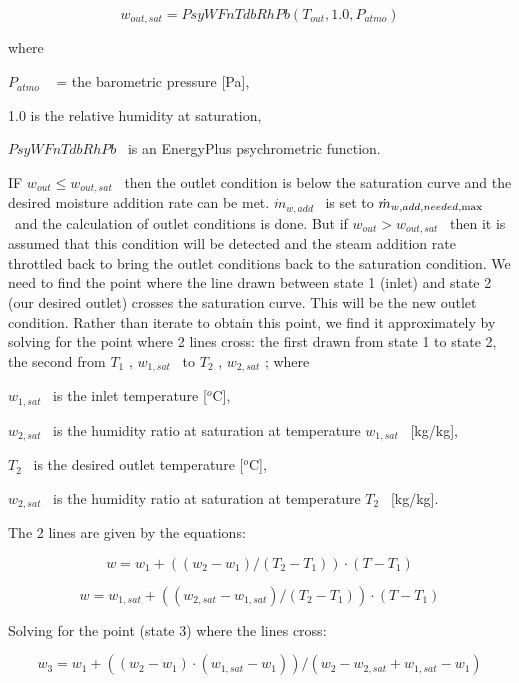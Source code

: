 \begin{equation}
{w_{out,sat}} = PsyWFnTdbRhPb({T_{out}},1.0,{P_{atmo}})
\end{equation}

where

\({P_{atmo}}\) ~ = the barometric pressure {[}Pa{]},

1.0 is the relative humidity at saturation,

\(PsyWFnTdbRhPb\) ~is an EnergyPlus psychrometric function.

IF \({w_{out}} \le {w_{out,sat}}\) ~then the outlet condition is below the saturation curve and the desired moisture addition rate can be met. \({\dot m_{w,add}}\) ~is set to \({\dot m_{w,add,needed,{\rm{max}}}}\) ~and the calculation of outlet conditions is done. But if \({w_{out}} > {w_{out,sat}}\) ~then it is assumed that this condition will be detected and the steam addition rate throttled back to bring the outlet conditions back to the saturation condition. We need to find the point where the line drawn between state 1 (inlet) and state 2 (our desired outlet) crosses the saturation curve. This will be the new outlet condition. Rather than iterate to obtain this point, we find it approximately by solving for the point where 2 lines cross: the first drawn from state 1 to state 2, the second from \({T_1}\) , \({w_{1,sat}}\) ~to \({T_2}\) , \({w_{2,sat}}\) ; where

\({w_{1,sat}}\) ~is the inlet temperature {[}\(^{o}\)C{]},

\({w_{2,sat}}\) ~is the humidity ratio at saturation at temperature \({w_{1,sat}}\) ~{[}kg/kg{]},

\({T_2}\) ~is the desired outlet temperature {[}\(^{o}\)C{]},

\({w_{2,sat}}\) ~is the humidity ratio at saturation at temperature \({T_2}\) ~{[}kg/kg{]}.

The 2 lines are given by the equations:

\begin{equation}
w = {w_1} + (({w_2} - {w_1})/({T_2} - {T_1})) \cdot (T - {T_1})
\end{equation}

\begin{equation}
w = {w_{1,sat}} + (({w_{2,sat}} - {w_{1,sat}})/({T_2} - {T_1})) \cdot (T - {T_1})
\end{equation}

Solving for the point (state 3) where the lines cross:

\begin{equation}
{w_3} = {w_1} + (({w_2} - {w_1}) \cdot ({w_{1,sat}} - {w_1}))/({w_2} - {w_{2,sat}} + {w_{1,sat}} - {w_1})
\end{equation}

